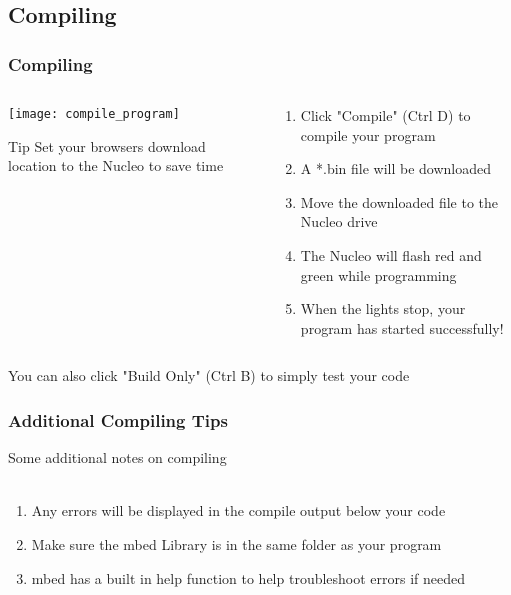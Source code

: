 \subsection{Compiling}
\label{sub:compiling}
\begin{frame}
	\frametitle{Compiling}
	\begin{columns}[c]
		\begin{column}{0.5\textwidth}
			\texttt{[image: compile\_program]}
			\begin{block}{Tip}
				Set your browsers download location to the Nucleo to save time
			\end{block}
		\end{column}
		\begin{column}{0.5\textwidth}
			\begin{enumerate}
				\item Click "Compile" (Ctrl D) to compile your program
				\item A *.bin file will be downloaded
				\item Move the downloaded file to the Nucleo drive
				\item The Nucleo will flash red and green while programming
				\item When the lights stop, your program has started successfully!
			\end{enumerate}
		\end{column}
	\end{columns}
	\begin{center}
		You can also click "Build Only" (Ctrl B) to simply test your code
	\end{center}
\end{frame}

\begin{frame}
	\frametitle{Additional Compiling Tips}
		Some additional notes on compiling \ \\ \ \\
			\begin{enumerate}
				\item Any errors will be displayed in the compile output below your code
				\item Make sure the mbed Library is in the same folder as your program
				\item mbed has a built in help function to help troubleshoot errors if needed
			\end{enumerate}

\end{frame}